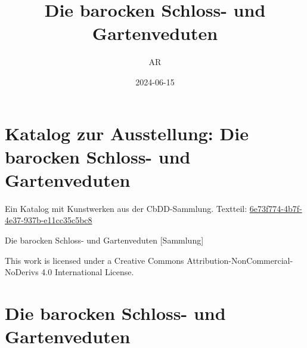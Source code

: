 \documentclass[
  a4paper,
]{book}
\title{Die barocken Schloss- und Gartenveduten}
\author{AR}
\date{2024-06-15}
\renewcommand*\contentsname{Table of contents}
\newcommand\contentsname{Table of contents}
\begin{document}
\frontmatter
\maketitle

\renewcommand*\contentsname{Table of contents}
{
\setcounter{tocdepth}{2}
\tableofcontents
}
\mainmatter
{}

\chapter{Katalog zur Ausstellung: Die barocken Schloss- und
Gartenveduten}\label{katalog-zur-ausstellung-die-barocken-schloss--und-gartenveduten}

Ein Katalog mit Kunstwerken aus der CbDD-Sammlung. Textteil:
\href{https://www.deckenmalerei.eu/42d06165-58e7-4653-bfe4-3d5f7091fc33\#6e73f774-4b7f-4e37-937b-e11cc35c5bc8}{6e73f774-4b7f-4e37-937b-e11cc35c5bc8}

Die barocken Schloss- und Gartenveduten {[}Sammlung{]}

This work is licensed under a Creative Commons
Attribution-NonCommercial-NoDerivs 4.0 International License.


\chapter{Die barocken Schloss- und
Gartenveduten}\label{die-barocken-schloss--und-gartenveduten}
\end{document}
